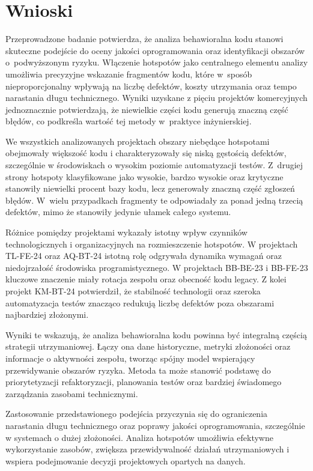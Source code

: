 \section{Wnioski}

Przeprowadzone badanie potwierdza, że analiza behawioralna kodu stanowi skuteczne podejście do oceny jakości oprogramowania oraz identyfikacji obszarów o~podwyższonym ryzyku. Włączenie hotspotów jako centralnego elementu analizy umożliwia precyzyjne wskazanie fragmentów kodu, które w~sposób nieproporcjonalny wpływają na liczbę defektów, koszty utrzymania oraz tempo narastania długu technicznego. Wyniki uzyskane z pięciu projektów komercyjnych jednoznacznie potwierdzają, że niewielkie części kodu generują znaczną część błędów, co podkreśla wartość tej metody w~praktyce inżynierskiej.

We wszystkich analizowanych projektach obszary niebędące hotspotami obejmowały większość kodu i charakteryzowały się niską gęstością defektów, szczególnie w środowiskach o wysokim poziomie automatyzacji testów. Z~drugiej strony hotspoty klasyfikowane jako wysokie, bardzo wysokie oraz krytyczne stanowiły niewielki procent bazy kodu, lecz generowały znaczną część zgłoszeń błędów. W~wielu przypadkach fragmenty te odpowiadały za ponad jedną trzecią defektów, mimo że stanowiły jedynie ułamek całego systemu.

Różnice pomiędzy projektami wykazały istotny wpływ czynników technologicznych i organizacyjnych na rozmieszczenie hotspotów. W projektach TL-FE-24 oraz AQ-BT-24 istotną rolę odgrywała dynamika wymagań oraz niedojrzałość środowiska programistycznego. W projektach BB-BE-23 i BB-FE-23 kluczowe znaczenie miały rotacja zespołu oraz obecność kodu legacy. Z kolei projekt KM-BT-24 potwierdził, że stabilność technologii oraz szeroka automatyzacja testów znacząco redukują liczbę defektów poza obszarami najbardziej złożonymi.

Wyniki te wskazują, że analiza behawioralna kodu powinna być integralną częścią strategii utrzymaniowej. Łączy ona dane historyczne, metryki złożoności oraz informacje o aktywności zespołu, tworząc spójny model wspierający przewidywanie obszarów ryzyka. Metoda ta może stanowić podstawę do priorytetyzacji refaktoryzacji, planowania testów oraz bardziej świadomego zarządzania zasobami technicznymi.

Zastosowanie przedstawionego podejścia przyczynia się do ograniczenia narastania długu technicznego oraz poprawy jakości oprogramowania, szczególnie w systemach o dużej złożoności. Analiza hotspotów umożliwia efektywne wykorzystanie zasobów, zwiększa przewidywalność działań utrzymaniowych i wspiera podejmowanie decyzji projektowych opartych na danych.

